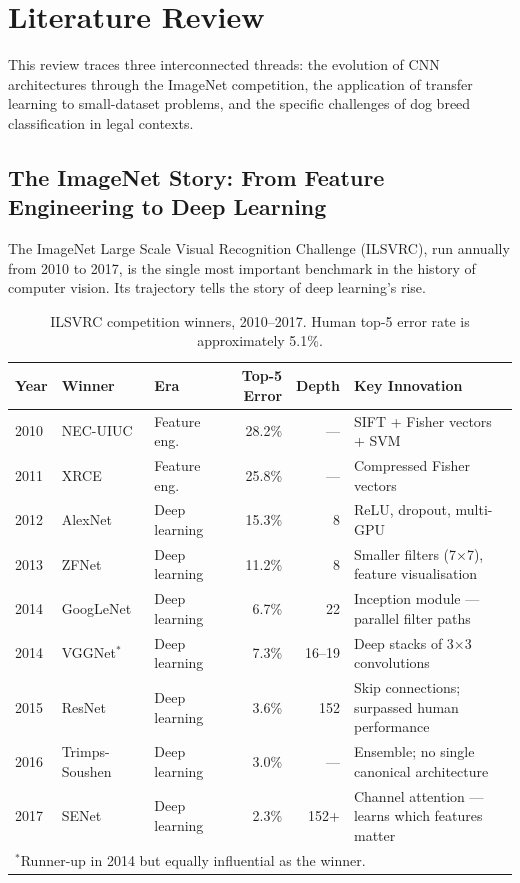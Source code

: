 \section{Literature Review}\label{sec:literature}

This review traces three interconnected threads: the evolution of CNN architectures through the ImageNet competition, the application of transfer learning to small-dataset problems, and the specific challenges of dog breed classification in legal contexts.

\subsection{The ImageNet Story: From Feature Engineering to Deep Learning}

The ImageNet Large Scale Visual Recognition Challenge (ILSVRC), run annually from 2010 to 2017, is the single most important benchmark in the history of computer vision. Its trajectory tells the story of deep learning's rise.

\begin{table}[H]
\centering
\caption{ILSVRC competition winners, 2010--2017. Human top-5 error rate is approximately 5.1\%.}
\label{tab:ilsvrc}
\begin{tabular}{lllrrl}
\toprule
\textbf{Year} & \textbf{Winner} & \textbf{Era} & \textbf{Top-5 Error} & \textbf{Depth} & \textbf{Key Innovation} \\
\midrule
2010 & NEC-UIUC   & Feature eng. & 28.2\% & --- & SIFT + Fisher vectors + SVM \\
2011 & XRCE       & Feature eng. & 25.8\% & --- & Compressed Fisher vectors \\
2012 & AlexNet    & Deep learning & 15.3\% & 8   & ReLU, dropout, multi-GPU \\
2013 & ZFNet      & Deep learning & 11.2\% & 8   & Smaller filters (7$\times$7), feature visualisation \\
2014 & GoogLeNet  & Deep learning &  6.7\% & 22  & Inception module --- parallel filter paths \\
2014 & VGGNet$^*$ & Deep learning &  7.3\% & 16--19 & Deep stacks of 3$\times$3 convolutions \\
2015 & ResNet     & Deep learning &  3.6\% & 152 & Skip connections; surpassed human performance \\
2016 & Trimps-Soushen & Deep learning & 3.0\% & --- & Ensemble; no single canonical architecture \\
2017 & SENet      & Deep learning &  2.3\% & 152+ & Channel attention --- learns which features matter \\
\bottomrule
\multicolumn{6}{l}{\footnotesize $^*$Runner-up in 2014 but equally influential as the winner.}
\end{tabular}
\end{table}

